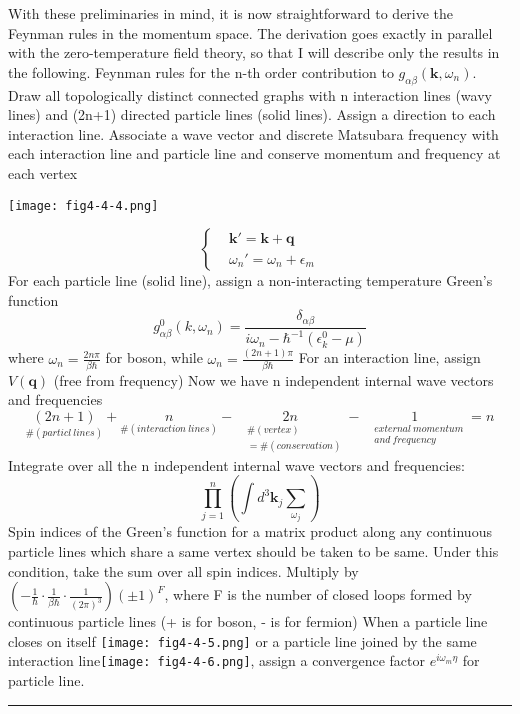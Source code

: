 With these preliminaries in mind, it is now straightforward to derive the Feynman rules in the momentum space.
The derivation goes exactly in parallel with the zero-temperature field theory, so that I will describe only the results in the following.
Feynman rules for the n-th order contribution to $g_{\alpha\beta}(\mathbf{k},\omega_n)$.
Draw all topologically distinct connected graphs with n interaction lines (wavy lines) and (2n+1) directed particle lines (solid lines).
Assign a direction to each interaction line. Associate a wave vector and discrete Matsubara frequency with each interaction line and particle line and conserve momentum and frequency at each vertex\\
\begin{center}
\texttt{[image: fig4-4-4.png]}
\end{center}
$$
\left\{
\begin{aligned}
&\mathbf{k}'=\mathbf{k}+\mathbf{q}\\
&\omega_n'=\omega_n+\epsilon_m
\end{aligned}
\right.
$$
For each particle line (solid line), assign a non-interacting temperature Green's function
\[
g_{\alpha\beta}^0(\mathbf{}k,\omega_n)=\frac{\delta_{\alpha\beta}}{i\omega_n-\hbar^{-1}(\epsilon_k^0-\mu)}
\]
where $\omega_n=\frac{2n\pi}{\beta\hbar}$ for boson, while $\omega_n=\frac{(2n+1)\pi}{\beta\hbar}$
For an interaction line, assign $V(\mathbf{q})$ (free from frequency)
Now we have n independent internal wave vectors and frequencies
\[
\underset{\#(particl\ lines)}{(2n+1)}+\underset{\#(interaction\ lines)}{n}-\underset{\begin{aligned}&\#(vertex)\\&=\#(conservation)\end{aligned}}{2n}-\underset{\begin{aligned}&external\ momentum\\&and\ frequency\end{aligned}}{1}=n
\]
Integrate over all the n independent internal wave vectors and frequencies:
\[
\prod_{j=1}^{n}\left(\int d^3\mathbf{k}_j\sum_{\omega_j}\right)
\]
Spin indices of the Green's function for a matrix product along any continuous particle lines which share a same vertex should be taken to be same. Under this condition, take the sum over all spin indices.
Multiply by $\left(-\frac{1}{\hbar}\cdot\frac{1}{\beta\hbar}\cdot\frac{1}{(2\pi)^3}\right)(\pm1)^F$, where F is the number of closed loops formed by continuous particle lines (+ is for boson, - is for fermion)
When a particle line closes on itself \texttt{[image: fig4-4-5.png]} or a particle line joined by the same interaction line\texttt{[image: fig4-4-6.png]}, assign a convergence factor $e^{i\omega_m\eta}$ for particle line.\\
\rule{\textwidth}{1mm}

